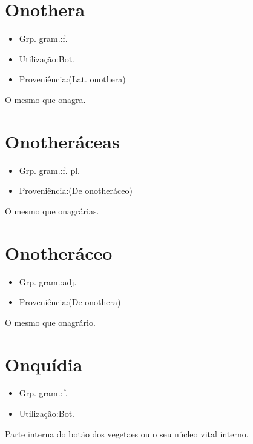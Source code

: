 \section{Onothera}
\begin{itemize}
\item {Grp. gram.:f.}
\end{itemize}
\begin{itemize}
\item {Utilização:Bot.}
\end{itemize}
\begin{itemize}
\item {Proveniência:(Lat. \textunderscore onothera\textunderscore )}
\end{itemize}
O mesmo que \textunderscore onagra\textunderscore .
\section{Onotheráceas}
\begin{itemize}
\item {Grp. gram.:f. pl.}
\end{itemize}
\begin{itemize}
\item {Proveniência:(De \textunderscore onotheráceo\textunderscore )}
\end{itemize}
O mesmo que \textunderscore onagrárias\textunderscore .
\section{Onotheráceo}
\begin{itemize}
\item {Grp. gram.:adj.}
\end{itemize}
\begin{itemize}
\item {Proveniência:(De \textunderscore onothera\textunderscore )}
\end{itemize}
O mesmo que \textunderscore onagrário\textunderscore .
\section{Onquídia}
\begin{itemize}
\item {Grp. gram.:f.}
\end{itemize}
\begin{itemize}
\item {Utilização:Bot.}
\end{itemize}
Parte interna do botão dos vegetaes ou o seu núcleo vital interno.
